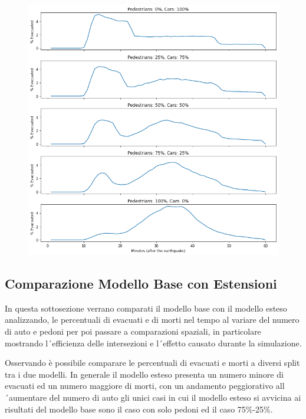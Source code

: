 \newpage
\begin{figure}[ht]
    \centering
    \includegraphics[width=\textwidth]{images/analisi/new-evtimes.png}
    \caption{}
    \label{fig:analisi-new-evtimes}
\end{figure}

\newpage

\subsection*{Comparazione Modello Base con Estensioni}
In questa sottosezione verrano comparati il modello base con il modello esteso analizzando,
le percentuali di evacuati e di morti nel tempo al variare del numero di auto e pedoni per poi passare a comparazioni spaziali,
in particolare mostrando l´efficienza delle intersezioni e l´effetto causato durante la simulazione.

Osservando \label{fig:analisi-comparison-total-ec} è possibile comparare le percentuali di evacuati e morti a diversi split tra i due modelli.
In generale il modello esteso presenta un numero minore di evacuati ed un numero maggiore di morti, con un andamento peggiorativo all´aumentare del numero di auto
gli unici casi in cui il modello esteso si avvicina ai risultati del modello base sono il caso con solo pedoni ed il caso 75\%-25\%.

